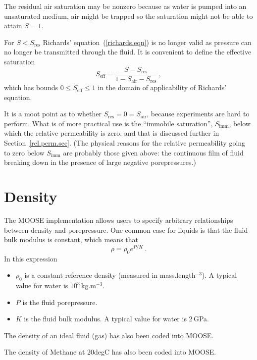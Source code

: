 \documentclass[]{scrreprt}
\begin{document}
The residual air saturation may be nonzero because as water is pumped
into an unsaturated medium, air might be trapped so the saturation
might not be able to attain $S=1$.

For $S<S_{\mathrm{res}}$ Richards' equation~(\ref{richards.eqn}) is no
longer valid as pressure can no longer be transmitted through the
fluid.  It is convenient to define the effective saturation
\begin{equation}
S_{\mathrm{eff}} = \frac{S - S_{\mathrm{res}}}{1 - S_{\mathrm{air}} -
  S_{\mathrm{res}}} \ ,
\end{equation}
which has bounds $0\leq S_{\mathrm{eff}} \leq 1$ in the domain of
applicability of Richards' equation.

It is a moot point as to whether
$S_{\mathrm{res}}=0=S_{\mathrm{air}}$, because experiments are hard to
perform.  What is of more practical use is the ``immobile
saturation'', $S_{\mathrm{imm}}$, below which the relative
permeability is zero, and that is discussed further in
Section~\ref{rel.perm.sec}.  (The physical reasons for the relative
permeability going to zero below $S_{\mathrm{imm}}$ are probably those
given above: the continuous film of fluid breaking down in the
presence of large negative porepressures.)


\section{Density}
\label{sec.density.constk}

The MOOSE implementation allows users to specify arbitrary
relationships between density and porepressure.  One common case
for liquids is that the fluid bulk modulus is constant, which means
that 
\begin{equation}
\rho = \rho_{0}e^{P/K} \ .
\end{equation}
In this expression
\begin{itemize}
\item $\rho_{0}$ is a constant reference density (measured in
  mass.length$^{-3}$).  A typical value for water is
  $10^{3}$\,kg.m$^{-3}$.
\item $P$ is the fluid porepressure.
\item $K$ is the fluid bulk modulus.  A typical value for water is
  2\,GPa.
\end{itemize}

The density of an ideal fluid (gas) has also been coded into MOOSE.

The density of Methane at 20degC has also been coded into MOOSE.
\end{document}
